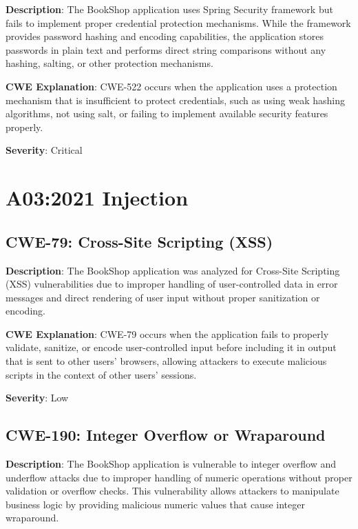 \documentclass[]{UCD_CS_FYP_Report}
\begin{document}
\textbf{Description}: The BookShop application uses Spring Security framework but fails to implement proper credential protection mechanisms. While the framework provides password hashing and encoding capabilities, the application stores passwords in plain text and performs direct string comparisons without any hashing, salting, or other protection mechanisms.

\textbf{CWE Explanation}: CWE-522 occurs when the application uses a protection mechanism that is insufficient to protect credentials, such as using weak hashing algorithms, not using salt, or failing to implement available security features properly.

\textbf{Severity}: Critical



\chapter{A03:2021 Injection}

\section{CWE-79: Cross-Site Scripting (XSS)}

\textbf{Description}: The BookShop application was analyzed for Cross-Site Scripting (XSS) vulnerabilities due to improper handling of user-controlled data in error messages and direct rendering of user input without proper sanitization or encoding.

\textbf{CWE Explanation}: CWE-79 occurs when the application fails to properly validate, sanitize, or encode user-controlled input before including it in output that is sent to other users' browsers, allowing attackers to execute malicious scripts in the context of other users' sessions.

\textbf{Severity}: Low



\section{CWE-190: Integer Overflow or Wraparound}

\textbf{Description}: The BookShop application is vulnerable to integer overflow and underflow attacks due to improper handling of numeric operations without proper validation or overflow checks. This vulnerability allows attackers to manipulate business logic by providing malicious numeric values that cause integer wraparound.
\end{document}
